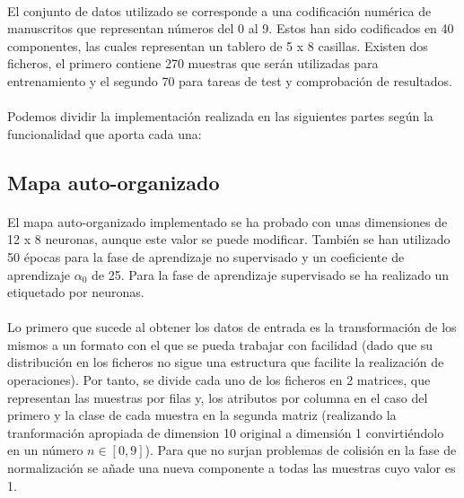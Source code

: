 \documentclass[10pt, a4paper,spanish]{article}
\begin{document}
		\paragraph{}
		El conjunto de datos utilizado se corresponde a una codificación numérica de manuscritos que representan números del 0 al 9. Estos han sido codificados en 40 componentes, las cuales representan un tablero de 5 x 8 casillas. Existen dos ficheros, el primero contiene 270 muestras que serán utilizadas para entrenamiento y el segundo 70 para tareas de test y comprobación de resultados.



		\paragraph{}
		Podemos dividir la implementación realizada en las siguientes partes según la funcionalidad que aporta cada una:

		\subsection{Mapa auto-organizado}

			\paragraph{}
			El mapa auto-organizado implementado se ha probado con unas dimensiones de 12 x 8 neuronas, aunque este valor se puede modificar. También se han utilizado 50 épocas para la fase de aprendizaje no supervisado y un coeficiente de aprendizaje $\alpha_0$ de 25. Para la fase de aprendizaje supervisado se ha realizado un etiquetado por neuronas.

			\paragraph{}
			Lo primero que sucede al obtener los datos de entrada es la transformación de los mismos a un formato con el que se pueda trabajar con facilidad (dado que su distribución en los ficheros no sigue una estructura que facilite la realización de operaciones). Por tanto, se divide cada uno de los ficheros en 2 matrices, que representan las muestras por filas y, los atributos por columna en el caso del primero y la clase de cada muestra en la segunda matriz (realizando la tranformación apropiada de dimension 10 original a dimensión 1 convirtiéndolo en un número $n \in [0,9]$). Para que no surjan problemas de colisión en la fase de normalización se añade una nueva componente a todas las muestras cuyo valor es 1.
\end{document}
